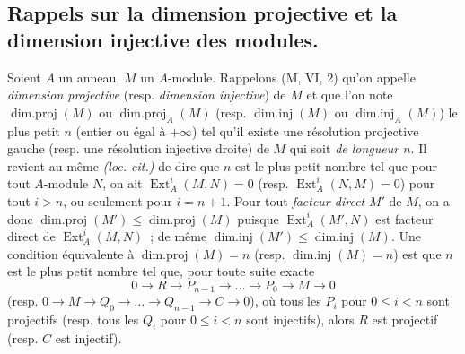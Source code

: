 \subsection{Rappels sur la dimension projective et la dimension injective des
modules.}
\label{subsection:0.17.2-fr}

\begin{env}[17.2.1]
\label{0.17.2.1-fr}
Soient $A$ un anneau, $M$ un $A$-module. Rappelons (M, VI, 2) qu'on appelle
\emph{dimension projective} (resp. \emph{dimension injective}) de $M$ et que
l'on note $\operatorname{dim.proj}(M)$ ou
$\operatorname{dim.proj}_A(M)$ (resp. $\operatorname{dim.inj}(M)$ ou
$\operatorname{dim.inj}_A(M)$) le plus petit $n$ (entier ou égal à $+\infty$)
tel qu'il existe une résolution projective gauche (resp. une résolution
injective droite) de $M$ qui soit \emph{de longueur $n$}. Il revient au même
\emph{(loc. cit.)} de dire que $n$ est le plus petit nombre tel que pour tout
$A$-module $N$, on ait $\operatorname{Ext}^i_A(M,N)=0$ (resp.
$\operatorname{Ext}^i_A(N,M)=0$) pour tout $i>n$, ou seulement pour $i=n+1$.
Pour tout \emph{facteur direct} $M'$ de $M$, on a donc
$\operatorname{dim.proj}(M')\leq\operatorname{dim.proj}(M)$ puisque
$\operatorname{Ext}^i_A(M',N)$ est facteur direct de
$\operatorname{Ext}^i_A(M,N)$~; de même
$\operatorname{dim.inj}(M')\leq\operatorname{dim.inj}(M)$. Une condition
équivalente à $\operatorname{dim.proj}(M)=n$ (resp.
$\operatorname{dim.inj}(M)=n$) est que $n$ est le plus petit nombre tel que,
pour toute suite exacte
\[
  0\longrightarrow R\longrightarrow P_{n-1}\longrightarrow\ldots
  \longrightarrow P_0\longrightarrow M\longrightarrow0
\]
(resp.
$0\longrightarrow M\longrightarrow Q_0\longrightarrow\ldots
\longrightarrow Q_{n-1}\longrightarrow C\longrightarrow0$), où tous les
$P_i$ pour $0\leq i<n$ sont projectifs (resp. tous les $Q_i$ pour $0\leq i<n$
sont injectifs), alors $R$ est projectif (resp. $C$ est injectif).
\end{env}

